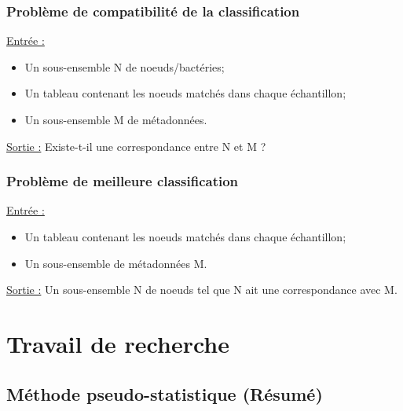 \documentclass{beamer}
\begin{document}

\begin{frame}
\frametitle{Problème de compatibilité de la classification}

\uline{Entrée :} \begin{itemize} \item Un sous-ensemble N de noeuds/bactéries; \item Un tableau contenant les noeuds matchés dans chaque échantillon; \item Un sous-ensemble M de métadonnées. \end{itemize}

\bigskip
\uline{Sortie :} Existe-t-il une correspondance entre N et M ?


\end{frame}

\begin{frame}
\frametitle{Problème de meilleure classification}

\uline{Entrée :} \begin{itemize} \item Un tableau contenant les noeuds matchés dans chaque échantillon; \item Un sous-ensemble de métadonnées M. \end{itemize}

\bigskip
\uline{Sortie :} Un sous-ensemble N de noeuds tel que N ait une correspondance avec M.


\end{frame}

\section{Travail de recherche}

\begin{frame}
\tableofcontents[currentsection]
\end{frame}

\subsection{Méthode pseudo-statistique (Résumé)}
\end{document}

